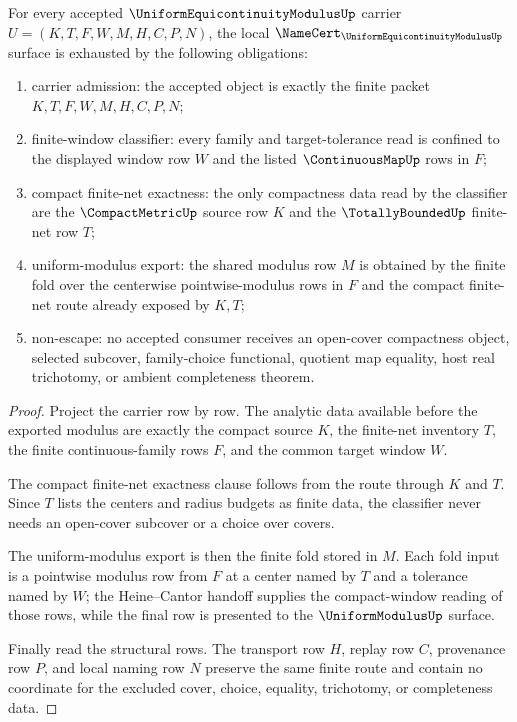 \begin{theorem}
\label{thm:uniform-equicontinuity-modulus-namecert-obligations}
For every accepted $\UniformEquicontinuityModulusUp$ carrier $U=(K,T,F,W,M,H,C,P,N)$, the local $\NameCert_{\UniformEquicontinuityModulusUp}$ surface is exhausted by the following obligations:
\begin{enumerate}
\item carrier admission: the accepted object is exactly the finite packet $K,T,F,W,M,H,C,P,N$;
\item finite-window classifier: every family and target-tolerance read is confined to the displayed window row $W$ and the listed $\ContinuousMapUp$ rows in $F$;
\item compact finite-net exactness: the only compactness data read by the classifier are the $\CompactMetricUp$ source row $K$ and the $\TotallyBoundedUp$ finite-net row $T$;
\item uniform-modulus export: the shared modulus row $M$ is obtained by the finite fold over the centerwise pointwise-modulus rows in $F$ and the compact finite-net route already exposed by $K,T$;
\item non-escape: no accepted consumer receives an open-cover compactness object, selected subcover, family-choice functional, quotient map equality, host real trichotomy, or ambient completeness theorem.
\end{enumerate}
\end{theorem}
\begin{proof}
Project the carrier row by row. The analytic data available before the exported modulus are exactly the compact source $K$, the finite-net inventory $T$, the finite continuous-family rows $F$, and the common target window $W$.

The compact finite-net exactness clause follows from the route through $K$ and $T$. Since $T$ lists the centers and radius budgets as finite data, the classifier never needs an open-cover subcover or a choice over covers.

The uniform-modulus export is then the finite fold stored in $M$. Each fold input is a pointwise modulus row from $F$ at a center named by $T$ and a tolerance named by $W$; the Heine--Cantor handoff supplies the compact-window reading of those rows, while the final row is presented to the $\UniformModulusUp$ surface.

Finally read the structural rows. The transport row $H$, replay row $C$, provenance row $P$, and local naming row $N$ preserve the same finite route and contain no coordinate for the excluded cover, choice, equality, trichotomy, or completeness data.
\end{proof}

